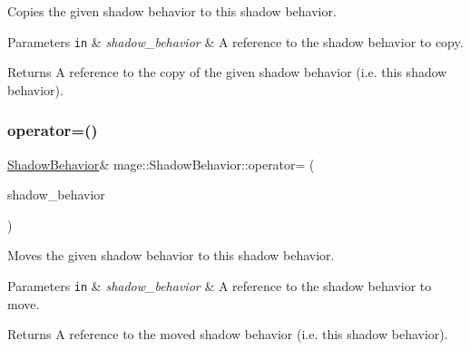 Copies the given shadow behavior to this shadow behavior.


\begin{DoxyParams}[1]{Parameters}
\mbox{\tt in}  & {\em shadow\+\_\+behavior} & A reference to the shadow behavior to copy. \\
\hline
\end{DoxyParams}
\begin{DoxyReturn}{Returns}
A reference to the copy of the given shadow behavior (i.\+e. this shadow behavior). 
\end{DoxyReturn}
\hypertarget{structmage_1_1_shadow_behavior_a28b03f100f172b7fee341bec449f966e}{}\label{structmage_1_1_shadow_behavior_a28b03f100f172b7fee341bec449f966e} 
\subsubsection{\texorpdfstring{operator=()}{operator=()}\hspace{0.1cm}{\footnotesize\ttfamily [2/2]}}
{\footnotesize\ttfamily \hyperlink{structmage_1_1_shadow_behavior}{Shadow\+Behavior}\& mage\+::\+Shadow\+Behavior\+::operator= (\begin{DoxyParamCaption}\item[{\hyperlink{structmage_1_1_shadow_behavior}{Shadow\+Behavior} \&\&}]{shadow\+\_\+behavior }\end{DoxyParamCaption})\hspace{0.3cm}{\ttfamily [default]}}

Moves the given shadow behavior to this shadow behavior.


\begin{DoxyParams}[1]{Parameters}
\mbox{\tt in}  & {\em shadow\+\_\+behavior} & A reference to the shadow behavior to move. \\
\hline
\end{DoxyParams}
\begin{DoxyReturn}{Returns}
A reference to the moved shadow behavior (i.\+e. this shadow behavior). 
\end{DoxyReturn}
\hypertarget{structmage_1_1_shadow_behavior_a8a4313130558be85ff9a3b8c890f0014}{}\label{structmage_1_1_shadow_behavior_a8a4313130558be85ff9a3b8c890f0014} 
